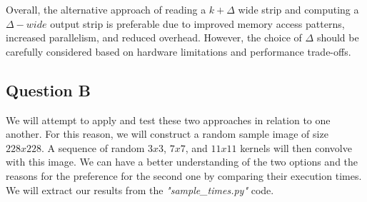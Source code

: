 Overall, the alternative approach of reading a $k + \Delta$ wide strip and computing a $\Delta-wide$ output strip is preferable due to improved memory access patterns, increased parallelism, and reduced overhead. However, the choice of $\Delta$ should be carefully considered based on hardware limitations and performance trade-offs.
\vspace{3mm}

\subsection{Question B}
We will attempt to apply and test these two approaches in relation to one another. For this reason, we will construct a random sample image of size $228 x 228$. A sequence of random $3x3$, $7x7$, and $11x11$ kernels will then convolve with this image. We can have a better understanding of the two options and the reasons for the preference for the second one by comparing their execution times.\\

We will extract our results from the \textit{"sample\_times.py"} code.

